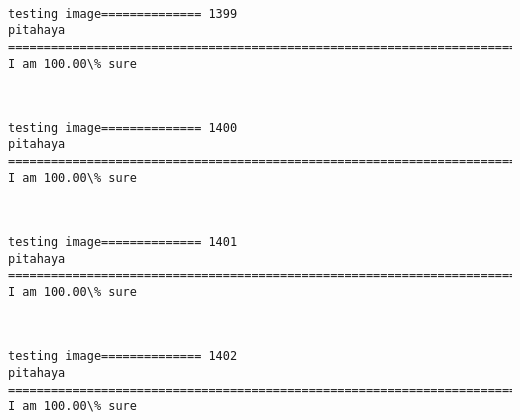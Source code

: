 \documentclass[11pt]{article}
\begin{document}
    \begin{center}
    \end{center}
    { \hspace*{\fill} \\}
    
    \begin{Verbatim}[commandchars=\\\{\}]
testing image============== 1399
pitahaya
============================================================================
I am 100.00\% sure

    \end{Verbatim}

    \begin{center}
    \end{center}
    { \hspace*{\fill} \\}
    
    \begin{Verbatim}[commandchars=\\\{\}]
testing image============== 1400
pitahaya
============================================================================
I am 100.00\% sure

    \end{Verbatim}

    \begin{center}
    \end{center}
    { \hspace*{\fill} \\}
    
    \begin{Verbatim}[commandchars=\\\{\}]
testing image============== 1401
pitahaya
============================================================================
I am 100.00\% sure

    \end{Verbatim}

    \begin{center}
    \end{center}
    { \hspace*{\fill} \\}
    
    \begin{Verbatim}[commandchars=\\\{\}]
testing image============== 1402
pitahaya
============================================================================
I am 100.00\% sure

    \end{Verbatim}
\end{document}
